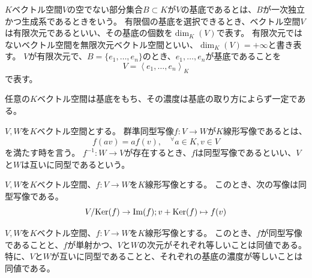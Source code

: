\begin{definition}[基底]
  $K$ベクトル空間$V$の空でない部分集合$B\subset K$が$V$の基底であるとは、$B$が一次独立かつ生成系であるときをいう。
  有限個の基底を選択できるとき、ベクトル空間$V$は有限次元であるといい、その基底の個数を$\dim_K(V)$で表す。
  有限次元ではないベクトル空間を無限次元ベクトル空間といい、$\dim_K(V)=+\infty$と書き表す。
  $V$が有限次元で、$B=\{e_1,\dots,e_n\}$のとき、$e_1,\dots,e_n$が基底であることを
  \[
    V=\left<e_1,\dots,e_n\right>_K
  \]
  で表す。
\end{definition}
\begin{theorem}[基底の存在と濃度の一意性]
  任意の$K$ベクトル空間は基底をもち、その濃度は基底の取り方によらず一定である。
\end{theorem}
\begin{definition}[線形写像]
  $V,W$を$K$ベクトル空間とする。
  群準同型写像$f:V\to W$が$K$線形写像であるとは、
  \[
    f(av)=af(v),\quad{}^\forall a\in K, v\in V
  \]
  を満たす時を言う。
  $f^{-1}:W\to V$が存在するとき、$f$は同型写像であるといい、$V$と$W$は互いに同型であるという。
\end{definition}
\begin{theorem}[線形写像の準同型定理]
  $V,W$を$K$ベクトル空間、$f:V\to W$を$K$線形写像とする。
  このとき、次の写像は同型写像である。
  \[
    V/{\rm Ker}(f)\to{\rm Im}(f);v+{\rm Ker}(f)\mapsto f(v)
  \]
\end{theorem}
\begin{theorem}
  $V,W$を$K$ベクトル空間、$f:V\to W$を$K$線形写像とする。
  このとき、$f$が同型写像であることと、$f$が単射かつ、$V$と$W$の次元がそれぞれ等しいことは同値である。
  特に、$V$と$W$が互いに同型であることと、それぞれの基底の濃度が等しいことは同値である。
\end{theorem}
